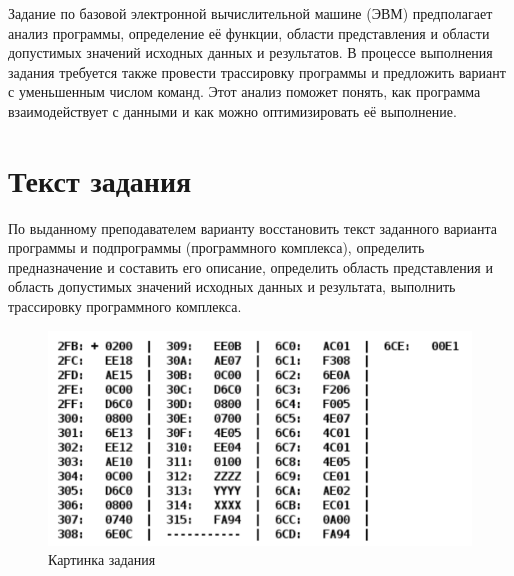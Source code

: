 \documentclass[14pt]{extreport}
\begin{document}
    \pagestyle{empty} %
    

    \pagestyle{plain} %
    \tableofcontents
    \intro Задание по базовой электронной вычислительной машине (ЭВМ) предполагает анализ программы, определение её функции, области представления и области допустимых значений исходных данных и результатов. В процессе выполнения задания требуется также провести трассировку программы и предложить вариант с уменьшенным числом команд. Этот анализ поможет понять, как программа взаимодействует с данными и как можно оптимизировать её выполнение.

    \chapter{Текст задания}
        По выданному преподавателем варианту восстановить текст заданного варианта программы и подпрограммы (программного комплекса), определить предназначение и составить его описание, определить область представления и область допустимых значений исходных данных и результата, выполнить трассировку программного комплекса.

        \begin{figure}[!h]
            \centering
            \includegraphics[width=0.8\linewidth]{task.png}
            \caption{Картинка задания}

        \end{figure}
\end{document}
